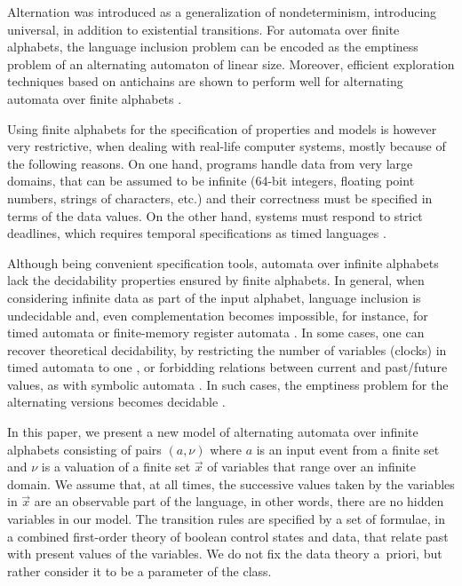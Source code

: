 \documentclass[10pt,conference,letterpaper,twocolumn]{IEEEtran}
\begin{document}
Alternation \cite{ChandraKozenStockmeyer81} was introduced as a
generalization of nondeterminism, introducing universal, in addition
to existential transitions. For automata over finite alphabets, the
language inclusion problem can be encoded as the emptiness problem of
an alternating automaton of linear size. Moreover, efficient
exploration techniques based on antichains are shown to perform well
for alternating automata over finite alphabets \cite{DeWulf08}.

Using finite alphabets for the specification of properties and models
is however very restrictive, when dealing with real-life computer
systems, mostly because of the following reasons. On one hand,
programs handle data from very large domains, that can be assumed to
be infinite (64-bit integers, floating point numbers, strings of
characters, etc.) and their correctness must be specified in terms of
the data values. On the other hand, systems must respond to strict
deadlines, which requires temporal specifications as timed
languages \cite{AlurDill94}.

Although being convenient specification tools, automata over infinite
alphabets lack the decidability properties ensured by finite
alphabets. In general, when considering infinite data as part of the
input alphabet, language inclusion is undecidable and, even
complementation becomes impossible, for instance, for timed automata
\cite{AlurDill94} or finite-memory register automata
\cite{Kaminski94}. In some cases, one can recover theoretical
decidability, by restricting the number of variables (clocks) in timed
automata to one \cite{OuaknineWorrell04}, or forbidding relations
between current and past/future values, as with symbolic automata
\cite{symbTransd:POPL12}. In such cases, the emptiness problem for the
alternating versions becomes decidable \cite{Lasota05,DAntoniKW16}.

In this paper, we present a new model of alternating automata over
infinite alphabets consisting of pairs $(a,\nu)$ where $a$ is an input
event from a finite set and $\nu$ is a valuation of a finite set
$\vec{x}$ of variables that range over an infinite domain. We assume
that, at all times, the successive values taken by the variables in
$\vec{x}$ are an observable part of the language, in other words,
there are no hidden variables in our model. The transition rules are
specified by a set of formulae, in a combined first-order theory of
boolean control states and data, that relate past with present values
of the variables. We do not fix the data theory a~priori, but rather
consider it to be a parameter of the class.
\end{document}
